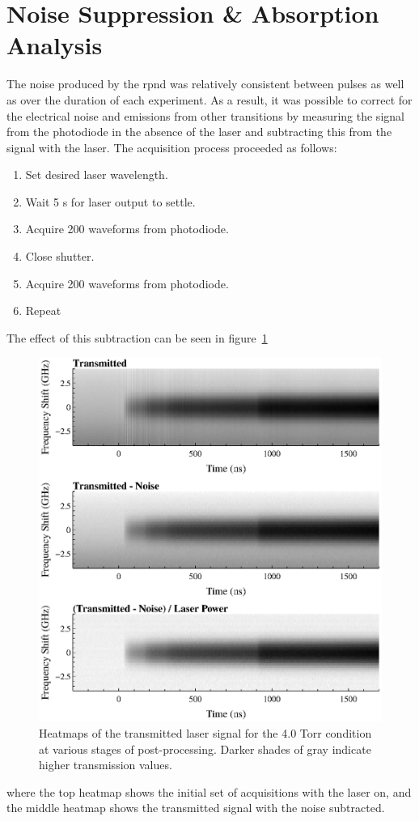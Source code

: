 \section{Noise Suppression \& Absorption Analysis}

The noise produced by the \acs{rpnd} was relatively consistent between pulses as
well as over the duration of each experiment. As a result, it was possible to
correct for the electrical noise and emissions from other transitions by
measuring the signal from the photodiode in the absence of the laser and
subtracting this from the signal with the laser. The acquisition process
proceeded as follows:
\begin{enumerate}
  \singlespacing
  \item Set desired laser wavelength.
  \item Wait 5 s for laser output to settle.
  \item Acquire 200 waveforms from photodiode.
  \item Close shutter.
  \item Acquire 200 waveforms from photodiode.
  \item Repeat
\end{enumerate}
The effect of this subtraction can be seen in figure~\ref{fig:contours}
\begin{figure}
  \centering
  \includegraphics{./chapters/metastables/figures/contours.eps}
  \caption{Heatmaps of the transmitted laser signal for the 4.0 Torr condition at 
    various stages of post-processing. Darker shades of gray indicate higher
    transmission values.}
  \label{fig:contours}
\end{figure}
where the top heatmap shows the initial set of acquisitions with the laser on,
and the middle heatmap shows the transmitted signal with the noise subtracted.

